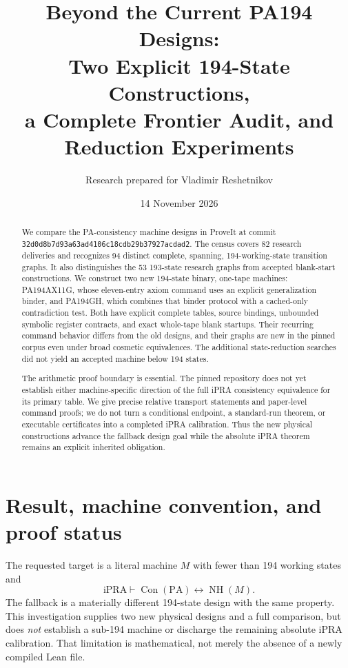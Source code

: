 \documentclass[11pt]{article}
\title{Beyond the Current PA194 Designs:\\Two Explicit 194-State Constructions,\\a Complete Frontier Audit, and Reduction Experiments}
\author{Research prepared for Vladimir Reshetnikov}
\date{14 November 2026}
\theoremstyle{definition}\newtheorem{definition}[theorem]{Definition}
\newcommand{\ipra}{\mathrm{iPRA}}
\newcommand{\PA}{\mathrm{PA}}
\newcommand{\Con}{\operatorname{Con}}
\newcommand{\NH}{\operatorname{NH}}
\begin{document}
\maketitle
\begin{abstract}
We compare the PA-consistency machine designs in ProveIt at commit
\nolinkurl{32d0d8b7d93a63ad4106c18cdb29b37927acdad2}.
The census covers 82 research deliveries and recognizes 94 distinct complete,
spanning, 194-working-state transition graphs. It also distinguishes the 53
193-state research graphs from accepted blank-start constructions.
We construct two new 194-state binary, one-tape machines: PA194AX11G,
whose eleven-entry axiom command uses an explicit generalization binder,
and PA194GH, which combines that binder protocol with a cached-only
contradiction test. Both have explicit complete tables, source bindings,
unbounded symbolic register contracts, and exact whole-tape blank startups.
Their recurring command behavior differs from the old designs, and their
graphs are new in the pinned corpus even under broad cosmetic equivalences.
The additional state-reduction searches did not yield an accepted machine
below 194 states.

The arithmetic proof boundary is essential. The pinned repository does not
yet establish either machine-specific direction of the full iPRA
consistency equivalence for its primary table. We give precise relative
transport statements and paper-level command proofs; we do not turn a
conditional endpoint, a standard-run theorem, or executable certificates
into a completed iPRA calibration. Thus the new physical constructions
advance the fallback design goal while the absolute iPRA theorem remains
an explicit inherited obligation.
\end{abstract}
\tableofcontents
\newpage

\section{Result, machine convention, and proof status}

The requested target is a literal machine $M$ with fewer than 194 working
states and
\[
 \ipra\vdash \Con(\PA)\leftrightarrow\NH(M).
\]
The fallback is a materially different 194-state design with the same
property. This investigation supplies two new physical designs and a full
comparison, but does \emph{not} establish a sub-194 machine or discharge
the remaining absolute iPRA calibration. That limitation is mathematical,
not merely the absence of a newly compiled Lean file.
\end{document}
